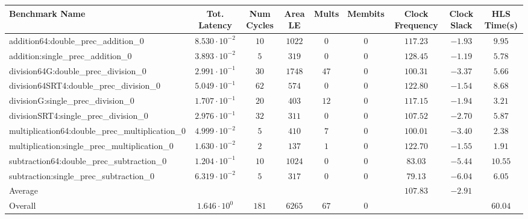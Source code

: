 \begin{tabular}{|l|c|c|c|c|c|c|c|c|}
\hline
Benchmark Name                                   & Tot. Latency            & Num Cycles & Area LE  & Mults  & Membits & Clock Frequency & Clock Slack & HLS Time(s) \\
\hline
addition64:double\_prec\_addition\_0             & $ 8.530 \cdot 10^{-2} $ & $ 10     $ & $ 1022 $ & $ 0  $ & $ 0   $ & $ 117.23      $ & $ -1.93   $ & $ 9.95    $ \\
addition:single\_prec\_addition\_0               & $ 3.893 \cdot 10^{-2} $ & $ 5      $ & $ 319  $ & $ 0  $ & $ 0   $ & $ 128.45      $ & $ -1.19   $ & $ 5.78    $ \\
division64G:double\_prec\_division\_0            & $ 2.991 \cdot 10^{-1} $ & $ 30     $ & $ 1748 $ & $ 47 $ & $ 0   $ & $ 100.31      $ & $ -3.37   $ & $ 5.66    $ \\
division64SRT4:double\_prec\_division\_0         & $ 5.049 \cdot 10^{-1} $ & $ 62     $ & $ 574  $ & $ 0  $ & $ 0   $ & $ 122.80      $ & $ -1.54   $ & $ 8.68    $ \\
divisionG:single\_prec\_division\_0              & $ 1.707 \cdot 10^{-1} $ & $ 20     $ & $ 403  $ & $ 12 $ & $ 0   $ & $ 117.15      $ & $ -1.94   $ & $ 3.21    $ \\
divisionSRT4:single\_prec\_division\_0           & $ 2.976 \cdot 10^{-1} $ & $ 32     $ & $ 311  $ & $ 0  $ & $ 0   $ & $ 107.52      $ & $ -2.70   $ & $ 5.87    $ \\
multiplication64:double\_prec\_multiplication\_0 & $ 4.999 \cdot 10^{-2} $ & $ 5      $ & $ 410  $ & $ 7  $ & $ 0   $ & $ 100.01      $ & $ -3.40   $ & $ 2.38    $ \\
multiplication:single\_prec\_multiplication\_0   & $ 1.630 \cdot 10^{-2} $ & $ 2      $ & $ 137  $ & $ 1  $ & $ 0   $ & $ 122.70      $ & $ -1.55   $ & $ 1.91    $ \\
subtraction64:double\_prec\_subtraction\_0       & $ 1.204 \cdot 10^{-1} $ & $ 10     $ & $ 1024 $ & $ 0  $ & $ 0   $ & $ 83.03       $ & $ -5.44   $ & $ 10.55   $ \\
subtraction:single\_prec\_subtraction\_0         & $ 6.319 \cdot 10^{-2} $ & $ 5      $ & $ 317  $ & $ 0  $ & $ 0   $ & $ 79.13       $ & $ -6.04   $ & $ 6.05    $ \\
\hline
Average                                          & $                     $ & $        $ & $      $ & $    $ & $     $ & $ 107.83      $ & $ -2.91   $ & $         $ \\
\hline
Overall                                          & $ 1.646 \cdot 10^{0}  $ & $ 181    $ & $ 6265 $ & $ 67 $ & $ 0   $ & $             $ & $         $ & $ 60.04   $ \\
\hline
\end{tabular}
